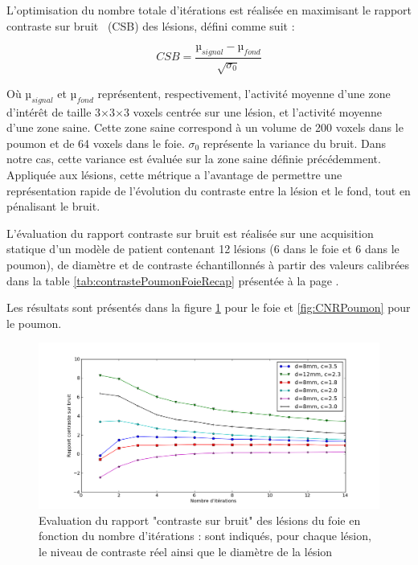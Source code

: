 L'optimisation du nombre totale d'itérations est réalisée en maximisant le rapport contraste sur bruit~\cite{takahara2004diffusion} (CSB) des lésions, défini comme suit :

\begin{equation}
 CSB = \frac{µ_{signal} - µ_{fond}}{\sqrt{\sigma_0}}
\end{equation}

Où $µ_{signal}$ et $µ_{fond}$ représentent, respectivement, l'activité moyenne d'une zone d'intérêt de taille 3$\times$3$\times$3 voxels centrée sur une lésion, et l'activité moyenne d'une zone saine. Cette zone saine correspond à un volume de 200 voxels dans le poumon et de 64 voxels dans le foie. $\sigma_0$ représente la variance du bruit. Dans notre cas, cette variance est évaluée sur la zone saine définie précédemment. Appliquée aux lésions, cette métrique a l'avantage de permettre une représentation rapide de l'évolution du contraste entre la lésion et le fond, tout en pénalisant le bruit.

L'évaluation du rapport contraste sur bruit est réalisée sur une acquisition statique d'un modèle de patient contenant 12 lésions (6 dans le foie et 6 dans le poumon), de diamètre et de contraste échantillonnés à partir des valeurs calibrées dans la table \ref{tab:contrastePoumonFoieRecap} présentée à la page \pageref{tab:contrastePoumonFoieRecap}.

Les résultats sont présentés dans la figure \ref{fig:CNRFoie} pour le foie et \ref{fig:CNRPoumon} pour le poumon.

\begin{figure}
\centering
\includegraphics[width=17cm]{images/CNRFoie}
\caption[\'Evaluation du rapport contraste sur bruit des lésions du foie en fonction du nombre d'itérations]{Evaluation du rapport "contraste sur bruit" des lésions du foie en fonction du nombre d'itérations : sont indiqués, pour chaque lésion, le niveau de contraste réel ainsi que le diamètre de la lésion}
\label{fig:CNRFoie}
\end{figure}


